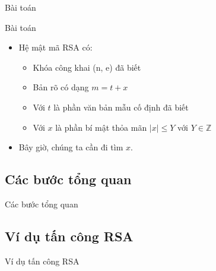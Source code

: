 \begin{frame}{Bài toán}

\begin{block}{Bài toán}
\begin{itemize}
\item Hệ mật mã RSA có:

\begin{itemize}
\item Khóa công khai (n, e) đã biết
\item Bản rõ có dạng $m = t + x$
\item Với $t$ là phần văn bản mẫu cố định đã biết
\item Với $x$ là phần bí mật thỏa mãn $|x| \leq Y$ với \(Y \in \mathbb{Z} \)
\end{itemize}
\item Bây giờ, chúng ta cần đi tìm $x$.
\end{itemize}

\end{block}

\end{frame}
\subsection{Các bước tổng quan}

\begin{frame}{Các bước tổng quan}

\end{frame}
\subsection{Ví dụ tấn công RSA}

\begin{frame}{Ví dụ tấn công RSA}

\end{frame}





